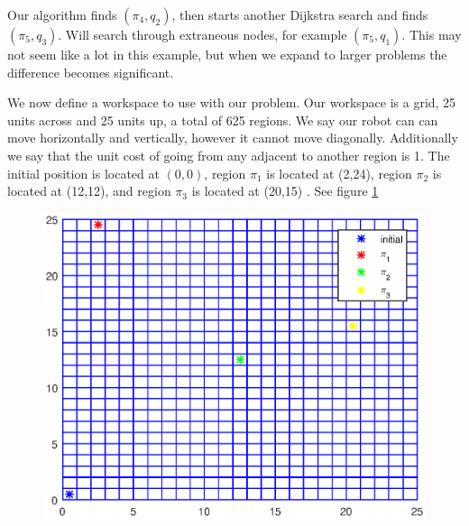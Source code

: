 Our algorithm finds $(\pi_4,q_2)$, then starts another Dijkstra search and finds $(\pi_5,q_3)$. Will search through extraneous nodes, for example $(\pi_5,q_1)$. This may not seem like a lot in this example, but when we expand to larger problems the difference becomes significant.

We now define a workspace to use with our problem. Our workspace is a grid, 25 units across and 25 units up, a total of 625 regions. We say our robot can can move horizontally and vertically, however it cannot move diagonally. Additionally we say that the unit cost of going from any adjacent to another region is 1. The initial position is located at $(0,0)$, region $\pi_1$ is located at (2,24), region $\pi_2$ is located at (12,12), and region $\pi_3$ is located at (20,15) . See figure \ref{fig:workspace}

\begin{figure}[!htb]
\centering
\includegraphics[scale=1]{workspace.eps}
\label{fig:workspace}
\end{figure}

